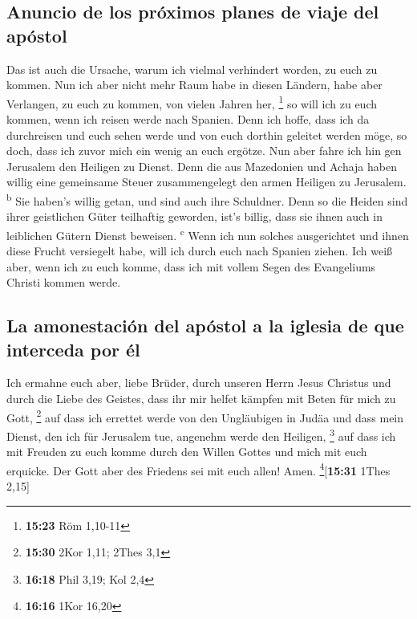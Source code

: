 \hypertarget{anuncio-de-los-pruxf3ximos-planes-de-viaje-del-apuxf3stol}{%
\subsection{Anuncio de los próximos planes de viaje del
apóstol}\label{anuncio-de-los-pruxf3ximos-planes-de-viaje-del-apuxf3stol}}

 Das ist auch die Ursache, warum ich vielmal verhindert
worden, zu euch zu kommen.  Nun ich aber nicht mehr Raum
habe in diesen Ländern, habe aber Verlangen, zu euch zu kommen, von
vielen Jahren her, \footnote{\textbf{15:23} Röm 1,10-11} 
so will ich zu euch kommen, wenn ich reisen werde nach Spanien. Denn ich
hoffe, dass ich da durchreisen und euch sehen werde und von euch dorthin
geleitet werden möge, so doch, dass ich zuvor mich ein wenig an euch
ergötze.  Nun aber fahre ich hin gen Jerusalem den
Heiligen zu Dienst.  Denn die aus Mazedonien und Achaja
haben willig eine gemeinsame Steuer zusammengelegt den armen Heiligen zu
Jerusalem. \textsuperscript{b}  Sie haben's willig getan,
und sind auch ihre Schuldner. Denn so die Heiden sind ihrer geistlichen
Güter teilhaftig geworden, ist's billig, dass sie ihnen auch in
leiblichen Gütern Dienst beweisen. \textsuperscript{c} 
Wenn ich nun solches ausgerichtet und ihnen diese Frucht versiegelt
habe, will ich durch euch nach Spanien ziehen.  Ich weiß
aber, wenn ich zu euch komme, dass ich mit vollem Segen des Evangeliums
Christi kommen werde.

\hypertarget{la-amonestaciuxf3n-del-apuxf3stol-a-la-iglesia-de-que-interceda-por-uxe9l}{%
\subsection{La amonestación del apóstol a la iglesia de que interceda
por
él}\label{la-amonestaciuxf3n-del-apuxf3stol-a-la-iglesia-de-que-interceda-por-uxe9l}}

 Ich ermahne euch aber, liebe Brüder, durch unseren Herrn
Jesus Christus und durch die Liebe des Geistes, dass ihr mir helfet
kämpfen mit Beten für mich zu Gott, \footnote{\textbf{15:30} 2Kor 1,11;
  2Thes 3,1}  auf dass ich errettet werde von den
Ungläubigen in Judäa und dass mein Dienst, den ich für Jerusalem tue,
angenehm werde den Heiligen, \footnote{\textbf{16:18} Phil 3,19; Kol 2,4}
 auf dass ich mit Freuden zu euch komme durch den Willen
Gottes und mich mit euch erquicke.  Der Gott aber des
Friedens sei mit euch allen! Amen. \footnote{\textbf{16:16} 1Kor 16,20}{[}\textbf{15:31}
1Thes 2,15{]}

